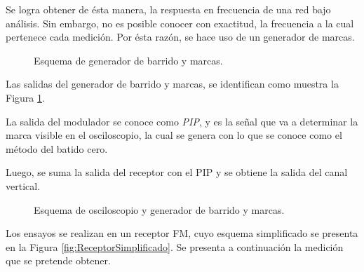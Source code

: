 Se logra obtener de ésta manera, la respuesta en frecuencia de una red bajo 
análisis. Sin embargo, 
no es posible conocer con exactitud, la frecuencia a la cual pertenece cada 
medición. Por ésta razón, se hace uso de un generador de marcas.

\begin{figure}[H]
  \centering
    \caption{Esquema de generador de barrido y marcas.}
    \label{fig:GenBarridoYMarca}
\end{figure}

Las salidas del generador de barrido y marcas, se identifican como muestra la Figura \ref{fig:GenBarridoYMarca}.

La salida del modulador se conoce como \textit{PIP}, y es la señal que va a determinar 
la marca visible en el osciloscopio, la cual se genera con lo que se conoce como 
el método del batido cero. 

Luego, se suma la salida del receptor con el PIP y se obtiene la salida del canal vertical.

\begin{figure}[H]
  \centering
    \caption{Esquema de osciloscopio y generador de barrido y marcas.}
    \label{fig:GenBarridoYMarcaOscilos}
\end{figure}


Los ensayos se realizan en un receptor FM, cuyo esquema simplificado se presenta 
en la Figura \ref{fig:ReceptorSimplificado}. Se presenta a continuación la medición 
que se pretende obtener.

